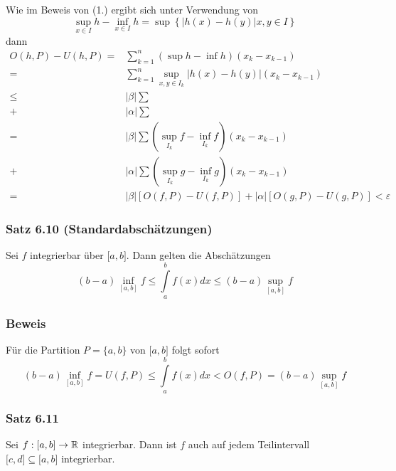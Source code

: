 \begin{enumerate}
Wie im Beweis von (1.) ergibt sich unter Verwendung von \[\mathop {\sup }\limits_{x \in I} h - \mathop {\inf }\limits_{x \in I} h = \sup \left\{ {\left| {h(x) - h(y)} \right|x,y \in I} \right\}\]
dann
\begin{align*}
O(h,P)-U(h,P) =&\sum\limits_{k = 1}^n {(\sup h - \inf h)({x_k} - {x_{k - 1}})} \\
 =&\sum\limits_{k = 1}^n {\mathop {\sup }\limits_{x,y \in {I_k}} \left| {h(x) - h(y)} \right|({x_k} - {x_{k - 1}})} \\
\le&\left| \beta  \right|\sum {\mathop {\mathop {\sup }\limits_{{I_k}} \left| {f(x) - f(y)} \right|({x_k} - {x_{k - 1}}) }}\\
+&\left| \alpha  \right|\sum {\mathop {\mathop {\sup }\limits_{{I_k}} \left| {g(x) - g(y)} \right|({x_k} - {x_{k - 1}})} } \\
=&\left| \beta  \right|\sum {(\mathop {\sup }\limits_{{I_k}} f - \mathop {\inf }\limits_{{I_k}} f)({x_k} - {x_{k - 1}})} \\
+&\left| \alpha  \right|\sum {(\mathop {\sup }\limits_{{I_k}} g - \mathop {\inf }\limits_{{I_k}} g)({x_k} - {x_{k - 1}})} \\
=&\left| \beta  \right|[O(f,P) - U(f,P)] + \left| \alpha  \right|[O(g,P) - U(g,P)] < \varepsilon
\end{align*}
\end{enumerate}

\subsubsection*{Satz 6.10 (Standardabschätzungen)}
Sei $f$ integrierbar über $\lbrack a,b \rbrack$. Dann gelten die Abschätzungen \[(b - a)\mathop {\inf }\limits_{[a,b]} f \le \int\limits_a^b {f(x)dx \le (b - a)\mathop {\sup }\limits_{[a,b]} f} \]
\subsubsection*{Beweis}
Für die Partition $P=\{ a,b\}$ von $\lbrack a,b\rbrack$ folgt sofort \[(b - a)\mathop {\inf }\limits_{[a,b]} f = U(f,P) \le \int\limits_a^b {f(x)dx < O(f,P) = (b - a)\mathop {\sup }\limits_{[a,b]} f} \]

\subsubsection*{Satz 6.11}
Sei $f:\lbrack a,b\rbrack\to\mathbb{R}$ integrierbar. Dann ist $f$ auch auf jedem Teilintervall $\lbrack c,d\rbrack\subseteq\lbrack a,b\rbrack$ integrierbar. \\

